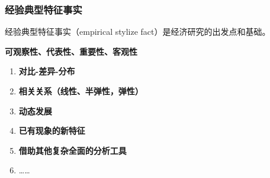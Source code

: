 \documentclass[aspectratio=169, 12pt]{beamer}
\begin{document}
\begin{frame}[plain]
    \frametitle{经验典型特征事实}
    经验典型特征事实（empirical stylize fact）是经济研究的出发点和基础。\par
    \textbf{可观察性、代表性、重要性、客观性} \par
    \addtolength{\parskip}{.8em}
    \begin{enumerate}
        \item  \textbf{对比-差异-分布}
        \item  \textbf{相关关系（线性、半弹性，弹性）}
        \item  \textbf{动态发展}
        \item  \textbf{已有现象的新特征}
        \item  \textbf{借助其他复杂全面的分析工具}
        \item  \ldots\ldots
    \end{enumerate}
\end{frame}
\end{document}
